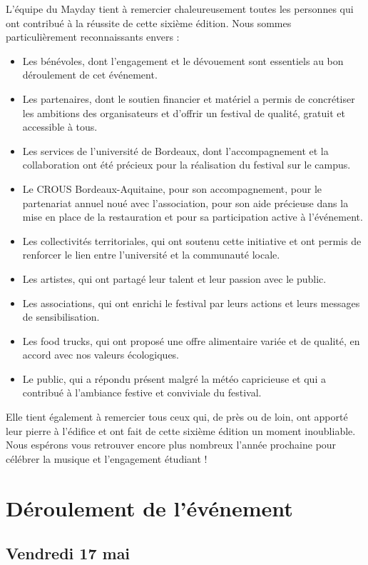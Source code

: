 \documentclass[12pt,a4paper]{report}
\begin{document}
L’équipe du Mayday tient à remercier chaleureusement toutes les personnes qui ont contribué à la réussite de cette sixième édition. Nous sommes particulièrement reconnaissants envers :
\begin{itemize}
\item Les bénévoles, dont l’engagement et le dévouement sont essentiels au bon déroulement de cet événement. 
\item Les partenaires, dont le soutien financier et matériel a permis de concrétiser les ambitions des organisateurs et d’offrir un festival de qualité, gratuit et accessible à tous.
\item Les services de l’université de Bordeaux, dont l’accompagnement et la collaboration ont été précieux pour la réalisation du festival sur le campus.
\item Le CROUS Bordeaux-Aquitaine, pour son accompagnement, pour le partenariat annuel noué avec l’association, pour son aide précieuse dans la mise en place de la restauration et pour sa participation active à l’événement.
\item Les collectivités territoriales, qui ont soutenu cette initiative et ont permis de renforcer le lien entre l’université et la communauté locale.
\item Les artistes, qui ont partagé leur talent et leur passion avec le public.
\item Les associations, qui ont enrichi le festival par leurs actions et leurs messages de sensibilisation.
\item Les food trucks, qui ont proposé une offre alimentaire variée et de qualité, en accord avec nos valeurs écologiques.
\item Le public, qui a répondu présent malgré la météo capricieuse et qui a contribué à l’ambiance festive et conviviale du festival.
\end{itemize}
Elle tient également à remercier tous ceux qui, de près ou de loin, ont apporté leur pierre à l’édifice et ont fait de cette sixième édition un moment inoubliable. Nous espérons vous retrouver encore plus nombreux l’année prochaine pour célébrer la musique et l’engagement étudiant !

\chapter{Déroulement de l'événement}

\section{Vendredi 17 mai}
\end{document}
